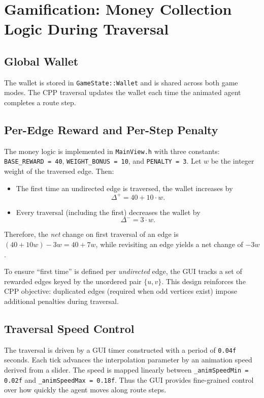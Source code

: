 \documentclass[conference]{IEEEtran}
\begin{document}
\section{Gamification: Money Collection Logic During Traversal}
\subsection{Global Wallet}
The wallet is stored in \texttt{GameState::Wallet} and is shared across both game modes.
The CPP traversal updates the wallet each time the animated agent completes a route step.

\subsection{Per-Edge Reward and Per-Step Penalty}
The money logic is implemented in \texttt{MainView.h} with three constants:
\texttt{BASE\_REWARD = 40}, \texttt{WEIGHT\_BONUS = 10}, and \texttt{PENALTY = 3}.
Let $w$ be the integer weight of the traversed edge.
Then:
\begin{itemize}
  \item The first time an undirected edge is traversed, the wallet increases by
  \[
    \Delta^+ = 40 + 10\cdot w.
  \]
  \item Every traversal (including the first) decreases the wallet by
  \[
    \Delta^- = 3\cdot w.
  \]
\end{itemize}
Therefore, the \emph{net} change on first traversal of an edge is $(40 + 10w) - 3w = 40 + 7w$, while revisiting an edge yields a net change of $-3w$.

To ensure ``first time'' is defined per \emph{undirected} edge, the GUI tracks a set of rewarded edges keyed by the unordered pair $\{u,v\}$.
This design reinforces the CPP objective: duplicated edges (required when odd vertices exist) impose additional penalties during traversal.

\subsection{Traversal Speed Control}
The traversal is driven by a GUI timer constructed with a period of \texttt{0.04f} seconds.
Each tick advances the interpolation parameter by an animation speed derived from a slider.
The speed is mapped linearly between \texttt{\_animSpeedMin = 0.02f} and \texttt{\_animSpeedMax = 0.18f}.
Thus the GUI provides fine-grained control over how quickly the agent moves along route steps.
\end{document}
